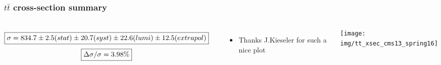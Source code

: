 \documentclass{beamer}
\begin{document}
\begin{frame}
\frametitle{$t\bar{t}$ cross-section summary}
\begin{columns}
\tiny
\begin{align}
\Aboxed{\sigma = 834.7 \pm 2.5 (stat) 
\pm 20.7 (syst) 
\pm 22.6 (lumi) 
\pm 12.5 (extrapol)} \nonumber
\end{align}
\vspace{-0.7cm}
\tiny
\begin{align}
\Aboxed{\Delta \sigma /\sigma  = 3.98 \% }\nonumber
\end{align}
\begin{itemize}
\small
\item Thanks J.Kieseler for such a nice plot
\end{itemize}
\vspace{-0.17cm}
 \texttt{[image: img/tt\_xsec\_cms13\_spring16]}

\end{columns}
\end{frame}
\begin{comment}
\begin{frame}
\frametitle{$t\bar{t}$ cross-section summary}
\begin{center}
\vspace{-0.35cm}
\texttt{[image: img/tt\_xsec\_cms13\_spring16]}
\end{center}
\vspace{-0.5cm}
\tiny
\begin{align}
\Aboxed{\sigma = 834.7 \pm 2.5 (stat) \pm 20.7 (syst) \pm 22.6 (lumi) \pm 12.5 (extrapol)}\nonumber
\end{align}
\begin{itemize}
\item $\Delta \sigma /\sigma  = 3.98 \%$
\item Thanks J.Kieseler for such a nice plot
\end{itemize}
\end{frame}
\end{comment}
\end{document}
